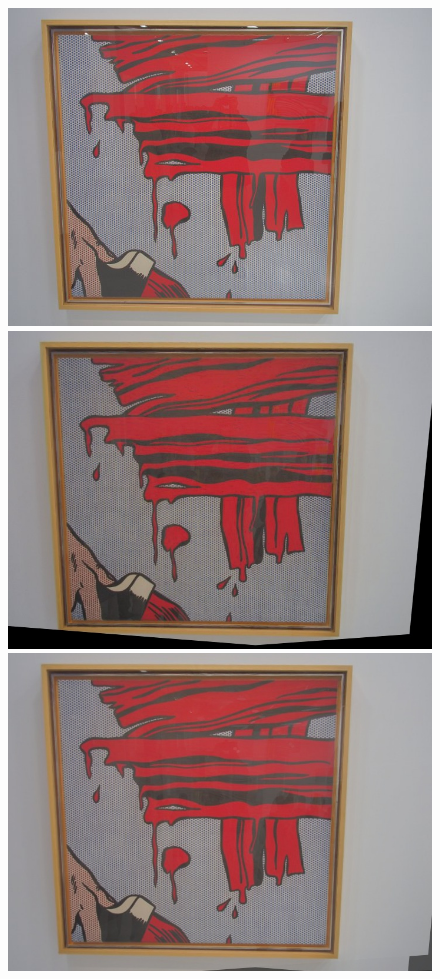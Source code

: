 \documentclass[12pt,a4paper]{article}
\begin{document}
\begin{figure}
\centering
\begin{minipage}{0.6\linewidth}
\includegraphics[width=\textwidth]{Fig/reference.jpg}
\end{minipage}
\begin{minipage}{0.6\linewidth}
\includegraphics[width=\textwidth]{Fig/merge_min.jpg}
\end{minipage}
\begin{minipage}{0.6\linewidth}
\includegraphics[width=\textwidth]{Fig/merge_median.jpg}

\end{minipage}
\end{figure}
\end{document}
